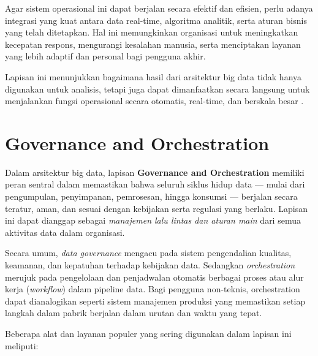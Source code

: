 Agar sistem operasional ini dapat berjalan secara efektif dan efisien, perlu adanya integrasi yang kuat antara data real-time, algoritma analitik, serta aturan bisnis yang telah ditetapkan. Hal ini memungkinkan organisasi untuk meningkatkan kecepatan respons, mengurangi kesalahan manusia, serta menciptakan layanan yang lebih adaptif dan personal bagi pengguna akhir.

Lapisan ini menunjukkan bagaimana hasil dari arsitektur big data tidak hanya digunakan untuk analisis, tetapi juga dapat dimanfaatkan secara langsung untuk menjalankan fungsi operasional secara otomatis, real-time, dan berskala besar \cite{gandomi2015beyond}.


\section{Governance and Orchestration}

Dalam arsitektur big data, lapisan \textbf{Governance and Orchestration} memiliki peran sentral dalam memastikan bahwa seluruh siklus hidup data — mulai dari pengumpulan, penyimpanan, pemrosesan, hingga konsumsi — berjalan secara teratur, aman, dan sesuai dengan kebijakan serta regulasi yang berlaku. Lapisan ini dapat dianggap sebagai \textit{manajemen lalu lintas dan aturan main} dari semua aktivitas data dalam organisasi.

Secara umum, \textit{data governance} mengacu pada sistem pengendalian kualitas, keamanan, dan kepatuhan terhadap kebijakan data. Sedangkan \textit{orchestration} merujuk pada pengelolaan dan penjadwalan otomatis berbagai proses atau alur kerja (\textit{workflow}) dalam pipeline data. Bagi pengguna non-teknis, orchestration dapat dianalogikan seperti sistem manajemen produksi yang memastikan setiap langkah dalam pabrik berjalan dalam urutan dan waktu yang tepat.

Beberapa alat dan layanan populer yang sering digunakan dalam lapisan ini meliputi:

